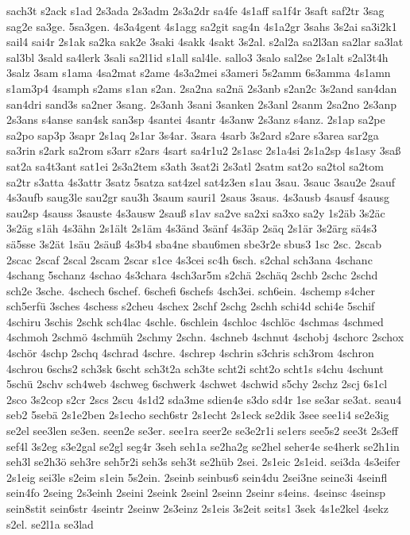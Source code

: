 {sach3t
s2ack
s1ad
2s3ada
2s3adm
2s3a2dr
sa4fe
4s1aff
sa1f4r
3saft
saf2tr
3sag
sag2e
sa3ge.
5sa3gen.
4s3a4gent
4s1agg
sa2git
sag4n
4s1a2gr
3sahs
3s2ai
sa3i2k1
sail4
sai4r
2s1ak
sa2ka
sak2e
3saki
4sakk
4sakt
3s2al.
s2al2a
sa2l3an
sa2lar
sa3lat
sal3bl
3sald
sa4lerk
3sali
sa2l1id
s1all
sal4le.
sallo3
3salo
sal2se
2s1alt
s2al3t4h
3salz
3sam
s1ama
4sa2mat
s2ame
4s3a2mei
s3ameri
5s2amm
6s3amma
4s1amn
s1am3p4
4samph
s2ams
s1an
s2an.
2sa2na
sa2nä
2s3anb
s2an2c
3s2and
san4dan
san4dri
sand3s
sa2ner
3sang.
2s3anh
3sani
3sanken
2s3anl
2sanm
2sa2no
2s3anp
2s3ans
s4anse
san4sk
san3sp
4santei
4santr
4s3anw
2s3anz
s4anz.
2s1ap
sa2pe
sa2po
sap3p
3sapr
2s1aq
2s1ar
3s4ar.
3sara
4sarb
3s2ard
s2are
s3area
sar2ga
sa3rin
s2ark
sa2rom
s3arr
s2ars
4sart
sa4r1u2
2s1asc
2s1a4si
2s1a2sp
4s1asy
3saß
sat2a
sa4t3ant
sat1ei
2s3a2tem
s3ath
3sat2i
2s3atl
2satm
sat2o
sa2tol
sa2tom
sa2tr
s3atta
4s3attr
3satz
5satza
sat4zel
sat4z3en
s1au
3sau.
3sauc
3sau2e
2sauf
4s3aufb
saug3le
sau2gr
sau3h
3saum
sauri1
2saus
3saus.
4s3ausb
4sausf
4sausg
sau2sp
4sauss
3sauste
4s3ausw
2sauß
s1av
sa2ve
sa2xi
sa3xo
sa2y
1s2äb
3s2äc
3s2äg
s1äh
4s3ähn
2s1ält
2s1äm
4s3änd
3sänf
4s3äp
2säq
2s1är
3s2ärg
sä4s3
sä5sse
3s2ät
1säu
2säuß
4s3b4
sba4ne
sbau6men
sbe3r2e
sbus3
1sc
2sc.
2scab
2scac
2scaf
2scal
2scam
2scar
s1ce
4s3cei
sc4h
6sch.
s2chal
sch3ana
4schanc
4schang
5schanz
4schao
4s3chara
4sch3ar5m
s2chä
2schäq
2schb
2schc
2schd
sch2e
3sche.
4schech
6schef.
6schefi
6schefs
4sch3ei.
sch6ein.
4schemp
s4cher
sch5erfü
3sches
4schess
s2cheu
4schex
2schf
2schg
2schh
schi4d
schi4e
5schif
4schiru
3schis
2schk
sch4lac
4schle.
6schlein
4schloc
4schlöc
4schmas
4schmed
4schmoh
2schmö
4schmüh
2schmy
2schn.
4schneb
4schnut
4schobj
4schorc
2schox
4schör
4schp
2schq
4schrad
4schre.
4schrep
4schrin
s3chris
sch3rom
4schron
4schrou
6schs2
sch3sk
6scht
sch3t2a
sch3te
scht2i
scht2o
scht1s
s4chu
4schunt
5schü
2schv
sch4web
4schweg
6schwerk
4schwet
4schwid
s5chy
2schz
2scj
6s1cl
2sco
3s2cop
s2cr
2scs
2scu
4s1d2
sda3me
sdien4e
s3do
sd4r
1se
se3ar
se3at.
seau4
seb2
5sebä
2s1e2ben
2s1echo
sech6str
2s1echt
2s1eck
se2dik
3see
see1i4
se2e3ig
se2el
see3len
se3en.
seen2e
se3er.
see1ra
seer2e
se3e2r1i
se1ers
see5s2
see3t
2s3eff
sef4l
3s2eg
s3e2gal
se2gl
seg4r
3seh
seh1a
se2ha2g
se2hel
seher4e
se4herk
se2h1in
seh3l
se2h3ö
seh3re
seh5r2i
seh3s
seh3t
se2hüb
2sei.
2s1eic
2s1eid.
sei3da
4s3eifer
2s1eig
sei3le
s2eim
s1ein
5s2ein.
2seinb
seinbus6
sein4du
2sei3ne
seine3i
4seinfl
sein4fo
2seing
2s3einh
2seini
2seink
2seinl
2seinn
2seinr
s4eins.
4seinsc
4seinsp
sein8stit
sein6str
4seintr
2seinw
2s3einz
2s1eis
3s2eit
seits1
3sek
4s1e2kel
4sekz
s2el.
se2l1a
se3lad
}
